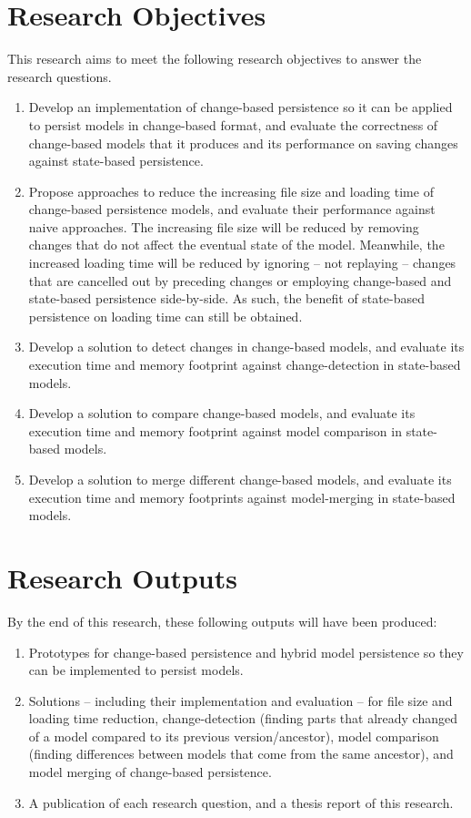\documentclass[12pt, a4paper]{report} \usepackage[titletoc]{appendix}
\begin{document}
\section{Research Objectives}
\label{sec:research_objectives}
This research aims to meet the following research objectives to answer the research questions.
\begin{enumerate}
	\item Develop an implementation of change-based persistence so it can be applied to persist models in change-based format, and evaluate the correctness of change-based models that it produces and its performance on saving changes against state-based persistence. 
	\item Propose approaches to reduce the increasing file size and loading time of change-based persistence models, and evaluate their performance against naive approaches. The increasing file size will be reduced by removing changes that do not affect the eventual state of the model. Meanwhile, the increased loading time will be reduced by ignoring -- not replaying -- changes that are cancelled out by preceding changes or employing change-based and state-based persistence side-by-side. As such, the benefit of state-based persistence on loading time can still be obtained. 
    \item Develop a solution to detect changes in change-based models, and evaluate its execution time and memory footprint against change-detection in state-based models.
	\item Develop a solution to compare change-based models, and evaluate its execution time and memory footprint against model comparison in state-based models.
	\item Develop a solution to merge different change-based models, and evaluate its execution time and memory footprints against model-merging in state-based models. 
\end{enumerate}

\section{Research Outputs}
\label{sec:research_outputs}
By the end of this research, these following outputs will have been produced:
\begin{enumerate}
	\item Prototypes for change-based persistence and hybrid model persistence so they can be implemented to persist models. 
	\item Solutions -- including their implementation and evaluation -- for file size and loading time reduction, change-detection (finding parts that already changed of a model compared to its previous version/ancestor), model comparison (finding differences between models that come from the same ancestor), and model merging of change-based persistence.
	\item A publication of each research question, and a thesis report of this research.
\end{enumerate}
\end{document}

